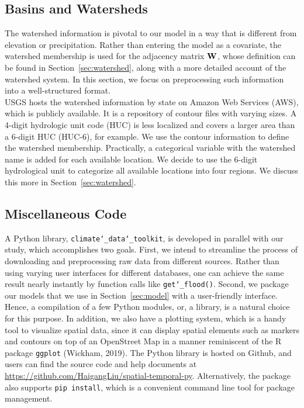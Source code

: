 \documentclass{svjour3}
\renewcommand\hl[1]{#1}
\begin{document}
\subsection{Basins and Watersheds}\label{subsec:basins-and-watersheds}
The watershed information is pivotal to our model in a way that is different from elevation or precipitation.
Rather than entering the model as a covariate, the watershed membership is used for the adjacency matrix $\bold W$, whose definition can be found in Section~\ref{sec:watershed}, along with a more detailed account of the watershed system.
In this section, we focus on preprocessing such information into a well-structured format. \\

USGS hosts the watershed information by state on Amazon Web Services (AWS), which is publicly available.
It is a repository of contour files with varying sizes.
A 4-digit hydrologic unit code (HUC) is less localized and covers a larger area \hl{than a 6-digit HUC (HUC-6), for example}.
We use the contour information to define the watershed membership.
Practically, a categorical variable with the watershed name is added for each available location.
We decide to use the 6-digit hydrological unit to categorize all available locations into four regions.
We discuss this more in Section~\ref{sec:watershed}.

\subsection{Miscellaneous Code}\label{subsec:code_intro}
A Python library, \texttt{climate\char`\_data\char`\_toolkit}, is developed in parallel with our study, which accomplishes two goals.
First, we intend to streamline the process of downloading and preprocessing  raw data from different sources.
Rather than using varying user interfaces for different databases, one can achieve the same result nearly instantly by function calls like \texttt{get\char`\_flood()}.
Second, we package our models that we use in Section~\ref{sec:model} with a user-friendly interface.
Hence, a compilation of a few Python modules, or, a library, is a natural choice for this purpose.
In addition, we also have a plotting system, which is a handy tool to visualize spatial data, since it can display spatial elements such as markers and contours on top of an OpenStreet Map in a manner reminiscent of the R package \texttt{ggplot} (Wickham, 2019).
The Python library is hosted on Github, and users can find the source code and help documents at \url{https://github.com/HaigangLiu/spatial-temporal-py}.
Alternatively, the package also supports \texttt{pip install}, which is a convenient command line tool for package management.
\end{document}

